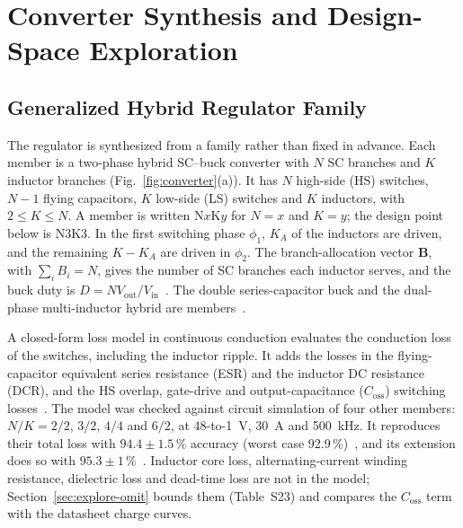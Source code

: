 \section{Converter Synthesis and Design-Space Exploration}\label{sec:dse}

\subsection{Generalized Hybrid Regulator Family}\label{sec:dse-family}
The regulator is synthesized from a family rather than fixed in advance. Each member is a
two-phase hybrid SC--buck converter with $N$ SC branches and $K$ inductor branches
(Fig.~\ref{fig:converter}(a)). It has $N$ high-side (HS) switches, $N-1$ flying capacitors, $K$
low-side (LS) switches and $K$ inductors, with $2\le K\le N$. A member is written N$x$K$y$ for
$N = x$ and $K = y$; the design point below is N3K3. In the first switching phase $\phi_1$, $K_A$
of the inductors are driven, and the remaining $K-K_A$ are driven in $\phi_2$. The
branch-allocation vector $\mathbf{B}$, with $\sum_i B_i = N$, gives the number of SC branches each
inductor serves, and the buck duty is $D = NV_{\mathrm{out}}/V_{\mathrm{in}}$~\cite{Abdelzaher2025ECTC,
Abdelzaher2026EPEPS}. The double series-capacitor buck and the dual-phase multi-inductor hybrid
are members~\cite{DSCH,DPMIH44}.

A closed-form loss model in continuous conduction evaluates the conduction loss of the switches,
including the inductor ripple. It adds the losses in the flying-capacitor equivalent series
resistance (ESR) and the inductor DC resistance (DCR), and the HS overlap, gate-drive and
output-capacitance ($C_{\mathrm{oss}}$) switching losses~\cite{Abdelzaher2025ECTC,
Abdelzaher2026EPEPS}. The model was checked against circuit simulation of four other members:
$N/K = 2/2$, $3/2$, $4/4$ and $6/2$, at 48-to-1~V, 30~A and 500~kHz. It reproduces their total loss
with $94.4\pm1.5$\,\% accuracy (worst case 92.9\,\%)~\cite{Abdelzaher2025ECTC}, and its
extension does so with $95.3\pm1$\,\%~\cite{Abdelzaher2026EPEPS}. Inductor core loss,
alternating-current winding resistance, dielectric loss and dead-time loss are not in the model;
Section~\ref{sec:explore-omit} bounds them (Table~S23) and compares the $C_{\mathrm{oss}}$ term with
the datasheet charge curves.

